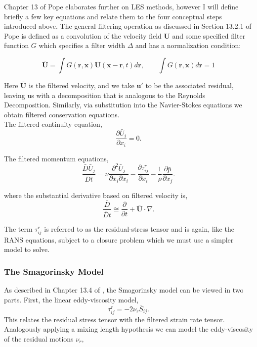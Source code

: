 \documentclass[12pt,letterpaper]{article}
\begin{document}
Chapter 13 of Pope \cite{pope2000} elaborates further on LES methods, however I will define briefly a few key equations and relate them to the four conceptual steps introduced above. The general filtering operation as discussed in Section 13.2.1 of Pope is defined as a convolution of the velocity field $\mathbf{U}$ and some specified filter function $G$ which specifies a filter width $\Delta$ and has a normalization condition:

\begin{equation}
    \bar{\mathbf{U}} = \int G(\mathbf{r}, \mathbf{x})\mathbf{U}(\mathbf{x - r}, t) d\mathbf{r}, \quad\quad \int G(\mathbf{r}, \mathbf{x}) d\mathbf{r} = 1
\end{equation}

Here $\bar{\mathbf{U}}$ is the filtered velocity, and we take $\mathbf{u'}$ to be the associated residual, leaving us with a decomposition that is analogous to the Reynolds Decomposition. Similarly, via substitution into the Navier-Stokes equations we obtain filtered conservation equations.\\

The filtered continuity equation,
\begin{equation}
    \frac{\partial \bar{U}_i}{\partial x_i} = 0. 
\end{equation}

The filtered momentum equations,
\begin{equation}
    \frac{\bar{D}\bar{U}_j}{\bar{D}t} = \nu \frac{\partial^2 \bar{U}_j}{\partial x_i \partial x_i} - \frac{\partial \tau^r_{ij}}{\partial x_i} - \frac{1}{\rho} \frac{\partial \bar{p}}{\partial x_j}. 
\end{equation}

where the substantial derivative based on filtered velocity is,
\begin{equation}
    \frac{\bar{D}}{\bar{D}t} \cong \frac{\partial}{\partial t} + \bar{\mathbf{U}}\cdot \nabla. 
\end{equation}

The term $\tau^r_{ij}$ is referred to as the residual-stress tensor and is again, like the RANS equations, subject to a closure problem which we must use a simpler model to solve. 

\subsubsection{The Smagorinsky Model} 
As described in Chapter 13.4 of \cite{pope2000}, the Smagorinsky model can be viewed in two parts. First, the linear eddy-viscosity model,
\begin{equation}
    \tau^r_{ij} = -2\nu_r\bar{S}_{ij}. 
\end{equation}
This relates the residual stress tensor with the filtered strain rate tensor. Analogously applying a mixing length hypothesis we can model the eddy-viscosity of the residual motions $\nu_r$, 
\end{document}
